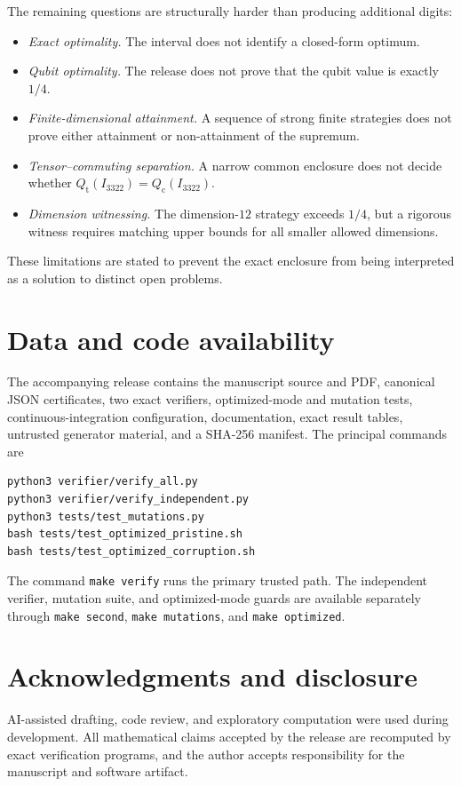 \documentclass[11pt]{article}
\newcommand{\1}{\mathbb{1}}
\newcommand{\Qt}{Q_{\mathrm t}}
\newcommand{\Qc}{Q_{\mathrm c}}
\begin{document}
The remaining questions are structurally harder than producing additional digits:
\begin{itemize}
\item \emph{Exact optimality.}  The interval does not identify a closed-form optimum.
\item \emph{Qubit optimality.}  The release does not prove that the qubit value is exactly $1/4$.
\item \emph{Finite-dimensional attainment.}  A sequence of strong finite strategies does not prove either attainment or non-attainment of the supremum.
\item \emph{Tensor--commuting separation.}  A narrow common enclosure does not decide whether $\Qt(I_{3322})=\Qc(I_{3322})$.
\item \emph{Dimension witnessing.}  The dimension-$12$ strategy exceeds $1/4$, but a rigorous witness requires matching upper bounds for all smaller allowed dimensions.
\end{itemize}
These limitations are stated to prevent the exact enclosure from being interpreted as a solution to distinct open problems.

\section*{Data and code availability}
The accompanying release contains the manuscript source and PDF, canonical JSON certificates, two exact verifiers, optimized-mode and mutation tests, continuous-integration configuration, documentation, exact result tables, untrusted generator material, and a SHA-256 manifest.  The principal commands are
\begin{lstlisting}[basicstyle=\ttfamily\small,frame=single]
python3 verifier/verify_all.py
python3 verifier/verify_independent.py
python3 tests/test_mutations.py
bash tests/test_optimized_pristine.sh
bash tests/test_optimized_corruption.sh
\end{lstlisting}
The command \texttt{make verify} runs the primary trusted path.  The independent verifier, mutation suite, and optimized-mode guards are available separately through \texttt{make second}, \texttt{make mutations}, and \texttt{make optimized}.

\section*{Acknowledgments and disclosure}
AI-assisted drafting, code review, and exploratory computation were used during development.  All mathematical claims accepted by the release are recomputed by exact verification programs, and the author accepts responsibility for the manuscript and software artifact.
\end{document}
